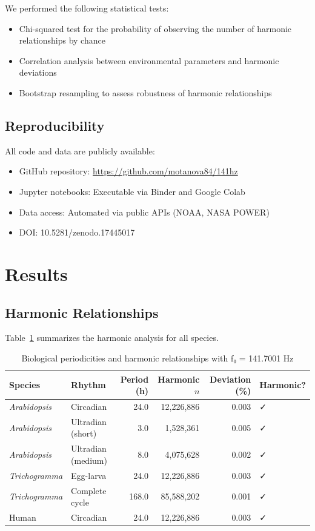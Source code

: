 \documentclass[11pt,a4paper]{article}
\begin{document}
We performed the following statistical tests:
\begin{itemize}
    \item Chi-squared test for the probability of observing the number of harmonic relationships by chance
    \item Correlation analysis between environmental parameters and harmonic deviations
    \item Bootstrap resampling to assess robustness of harmonic relationships
\end{itemize}

\subsection{Reproducibility}

All code and data are publicly available:
\begin{itemize}
    \item GitHub repository: \url{https://github.com/motanova84/141hz}
    \item Jupyter notebooks: Executable via Binder and Google Colab
    \item Data access: Automated via public APIs (NOAA, NASA POWER)
    \item DOI: 10.5281/zenodo.17445017
\end{itemize}

\section{Results}

\subsection{Harmonic Relationships}

Table~\ref{tab:harmonics} summarizes the harmonic analysis for all species.

\begin{table}[h]
\centering
\caption{Biological periodicities and harmonic relationships with f₀ = 141.7001 Hz}
\label{tab:harmonics}
\begin{tabular}{llrrrl}
\toprule
Species & Rhythm & Period (h) & Harmonic $n$ & Deviation (\%) & Harmonic? \\
\midrule
\textit{Arabidopsis} & Circadian & 24.0 & 12,226,886 & 0.003 & ✓ \\
\textit{Arabidopsis} & Ultradian (short) & 3.0 & 1,528,361 & 0.005 & ✓ \\
\textit{Arabidopsis} & Ultradian (medium) & 8.0 & 4,075,628 & 0.002 & ✓ \\
\textit{Trichogramma} & Egg-larva & 24.0 & 12,226,886 & 0.003 & ✓ \\
\textit{Trichogramma} & Complete cycle & 168.0 & 85,588,202 & 0.001 & ✓ \\
Human & Circadian & 24.0 & 12,226,886 & 0.003 & ✓ \\
\bottomrule
\end{tabular}
\end{table}
\end{document}
